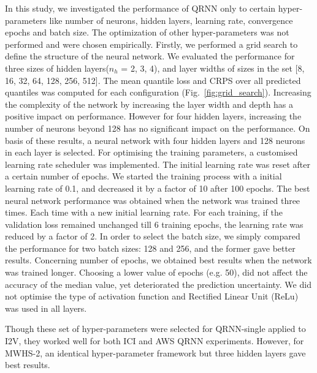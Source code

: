 \documentclass[amt, manuscript]{copernicus}
\begin{document}
In this study, we investigated the performance of QRNN only to certain hyper-parameters like number of neurons, hidden layers, learning rate, convergence epochs and batch size. The optimization of other hyper-parameters was not performed and were chosen empirically. Firstly, we performed a grid search to define the structure of the neural network. We evaluated the performance for three sizes of hidden layers($n_h$ = 2, 3, 4), and layer widths of sizes in the set [8, 16, 32, 64, 128, 256, 512]. The mean quantile loss and CRPS over all predicted quantiles was computed for each configuration (Fig.~\ref{fig:grid_search}). Increasing the complexity of the network by increasing the layer width and depth has a positive impact on performance. However for four hidden layers, increasing the number of neurons beyond 128 has no significant impact on the performance. On basis of these results, a neural network with four hidden layers and 128 neurons in each layer is selected. For optimising the training parameters, a customised  learning rate scheduler was implemented. The initial learning rate was reset after a certain number of epochs.  We started the training process with a initial learning rate of 0.1, and decreased it by a factor of 10 after 100 epochs. The best neural network performance was obtained when the network was trained three times. Each time with a new initial learning rate. For each training, if the validation loss remained unchanged till 6 training epochs, the learning rate was reduced by a factor of 2. 
In order to select the batch size, we simply compared the performance for two batch sizes: 128 and 256, and the former gave better results. Concerning number of epochs, we obtained best results when the network was trained longer. Choosing a lower value of epochs (e.g. 50), did not affect the accuracy of the median value, yet deteriorated the prediction uncertainty. We did not optimise the type of activation function and Rectified Linear Unit (ReLu) was used in all layers. 

Though these set of hyper-parameters were selected for QRNN-single applied to I2V, they worked well for both ICI and AWS QRNN experiments. However, for MWHS-2, an identical hyper-parameter framework but three hidden layers gave best results.  



\noappendix       %
\end{document}
